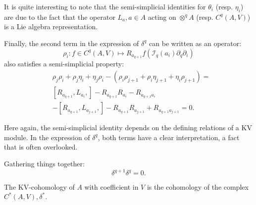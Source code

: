 \begin{rem}
    It is quite interesting to note that the semi-simplicial identities for $\theta_i$ (resp. $\eta_i$) are due to the fact that the operator $L_a, a \in A $ acting on $\otimes^q A$ (resp. $C^q(A,V)$) is a Lie algebra representation. 
\end{rem}
Finally, the second term in the expression of $\delta^q$ can be written as an operator:
\begin{equation}
    \label{eq:rho_operator}
    \rho_i \colon f \in C^q(A,V) \mapsto R_{a_{q+1}} f\left(\mathcal{I}_q(a_i)\partial_q \partial_i\right)
\end{equation}
also satisfies a semi-simplicial property:
\begin{equation}
    \label{eq:rho_semi_simplicial}
    \begin{split}
    &\rho_j \rho_i + \rho_j \eta_i + \eta_j \rho_i - \left( \rho_i \rho_{j+1} + \rho_i \eta_{j+1} + \eta_i \rho_{j+1} \right) = \\
    &\left[ R_{a_{q+1}},L_{a_i},\right] - R_{a_{q+1}}R_{a_i} -R_{a_{q+1}a_i}  \\
    &-\left[ R_{a_{q+1}},L_{a_{j+1}},\right] - R_{a_{q+1}}R_{a_{j+1}}+ R_{a_{q+1}a_{j+1}}  = 0.
    \end{split}
\end{equation}
\begin{rem}
Here again, the semi-simplicial identity depends on the defining relations of a KV module. In the expression of $\delta^q$, both terms have a clear interpretation, a fact that is often overlooked.
\end{rem}
Gathering things together:
\begin{equation}
    \label{eq:delta_semi_simplicial}
    \delta^{q+1}\delta^q = 0.
\end{equation}

\begin{defn}
\label{def:kv_cohomology}
The KV-cohomology of $A$ with coefficient in $V$ is the cohomology of the complex $C^*\left( A,V \right), \delta^*.$
\end{defn}
